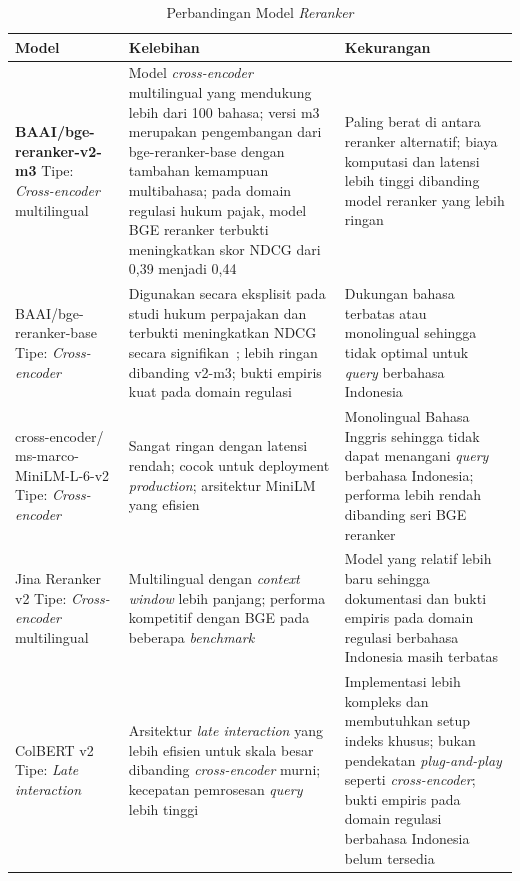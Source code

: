 \begin{table}[H]
\centering
\small
\caption{Perbandingan Model \textit{Reranker}}
\label{tab:perbandingan_reranker}
\begin{tabular}{|p{3.2cm}|p{5.6cm}|p{5.6cm}|}
\hline
\textbf{Model} & \textbf{Kelebihan} & \textbf{Kekurangan} \\
\hline
\textbf{BAAI/bge-reranker-v2-m3} \newline Tipe: \textit{Cross-encoder} multilingual &
Model \textit{cross-encoder} multilingual yang mendukung lebih dari 100 bahasa; versi m3 merupakan pengembangan dari bge-reranker-base dengan tambahan kemampuan multibahasa; pada domain regulasi hukum pajak, model BGE reranker terbukti meningkatkan skor NDCG dari 0,39 menjadi 0,44~\cite{rustamov2025tax} &
Paling berat di antara reranker alternatif; biaya komputasi dan latensi lebih tinggi dibanding model reranker yang lebih ringan \\
\hline
BAAI/bge-reranker-base \newline Tipe: \textit{Cross-encoder} &
Digunakan secara eksplisit pada studi hukum perpajakan dan terbukti meningkatkan NDCG secara signifikan~\cite{rustamov2025tax}; lebih ringan dibanding v2-m3; bukti empiris kuat pada domain regulasi &
Dukungan bahasa terbatas atau monolingual sehingga tidak optimal untuk \textit{query} berbahasa Indonesia \\
\hline
cross-encoder/ \newline ms-marco-MiniLM-L-6-v2 \newline Tipe: \textit{Cross-encoder} &
Sangat ringan dengan latensi rendah; cocok untuk deployment \textit{production}; arsitektur MiniLM yang efisien~\cite{reimers2019sbert} &
Monolingual Bahasa Inggris sehingga tidak dapat menangani \textit{query} berbahasa Indonesia; performa lebih rendah dibanding seri BGE reranker \\
\hline
Jina Reranker v2 \newline Tipe: \textit{Cross-encoder} multilingual &
Multilingual dengan \textit{context window} lebih panjang; performa kompetitif dengan BGE pada beberapa \textit{benchmark} &
Model yang relatif lebih baru sehingga dokumentasi dan bukti empiris pada domain regulasi berbahasa Indonesia masih terbatas \\
\hline
ColBERT v2 \newline Tipe: \textit{Late interaction} &
Arsitektur \textit{late interaction} yang lebih efisien untuk skala besar dibanding \textit{cross-encoder} murni; kecepatan pemrosesan \textit{query} lebih tinggi~\cite{khattab2020colbert} &
Implementasi lebih kompleks dan membutuhkan setup indeks khusus; bukan pendekatan \textit{plug-and-play} seperti \textit{cross-encoder}; bukti empiris pada domain regulasi berbahasa Indonesia belum tersedia \\
\hline
\end{tabular}
\end{table}

